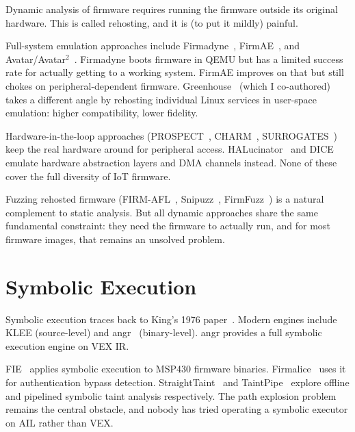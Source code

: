 Dynamic analysis of firmware requires running the firmware outside its original hardware. This is called rehosting, and it is (to put it mildly) painful.

Full-system emulation approaches include Firmadyne~\cite{chen2016firmadyne}, FirmAE~\cite{kim2020firmae}, and Avatar/Avatar$^2$~\cite{zaddach2014avatar,muench2018avatar2}. Firmadyne boots firmware in QEMU but has a limited success rate for actually getting to a working system. FirmAE improves on that but still chokes on peripheral-dependent firmware. Greenhouse~\cite{tay2023greenhouse} (which I co-authored) takes a different angle by rehosting individual Linux services in user-space emulation: higher compatibility, lower fidelity.

Hardware-in-the-loop approaches (PROSPECT~\cite{kammerstetter2014prospect}, CHARM~\cite{talebi2018charm}, SURROGATES~\cite{koscher2015surrogates}) keep the real hardware around for peripheral access. HALucinator~\cite{clements2020halucinator} and DICE~\cite{mera2021dice} emulate hardware abstraction layers and DMA channels instead. None of these cover the full diversity of IoT firmware.

Fuzzing rehosted firmware (FIRM-AFL~\cite{zheng2019firmafl}, Snipuzz~\cite{feng2021snipuzz}, FirmFuzz~\cite{srivastava2019firmfuzz}) is a natural complement to static analysis. But all dynamic approaches share the same fundamental constraint: they need the firmware to actually run, and for most firmware images, that remains an unsolved problem.

\section{Symbolic Execution}

Symbolic execution traces back to King's 1976 paper~\cite{king1976symbolic}. Modern engines include KLEE (source-level) and angr~\cite{shoshitaishvili2016sok} (binary-level). angr provides a full symbolic execution engine on VEX IR.

FIE~\cite{davidson2013fie} applies symbolic execution to MSP430 firmware binaries. Firmalice~\cite{shoshitaishvili2015firmalice} uses it for authentication bypass detection. StraightTaint~\cite{ming2016straighttaint} and TaintPipe~\cite{ming2015taintpipe} explore offline and pipelined symbolic taint analysis respectively. The path explosion problem~\cite{krishnamoorthy2010tackling} remains the central obstacle, and nobody has tried operating a symbolic executor on AIL rather than VEX.

